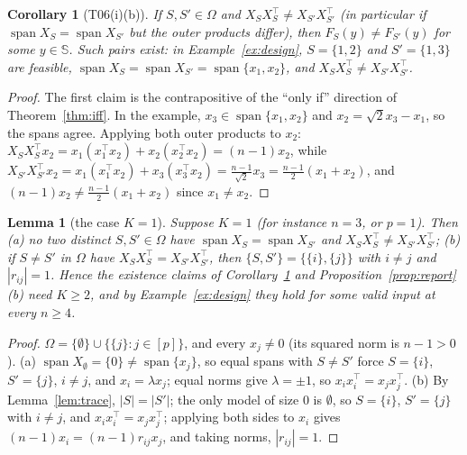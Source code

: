 \documentclass[11pt]{article}
\newtheorem{lemma}[theorem]{Lemma}
\newtheorem{corollary}[theorem]{Corollary}
\theoremstyle{remark}
\newcommand{\Sph}{\mathbb S}
\DeclareMathOperator{\spn}{span}
\begin{document}
\begin{corollary}[T06(i)(b)]\label{cor:span}
If $S,S'\in\Omega$ and $X_SX_S^\top\ne X_{S'}X_{S'}^\top$ (in particular if $\spn X_S=\spn X_{S'}$ but the outer products differ), then $F_S(y)\ne F_{S'}(y)$ for some $y\in\Sph$. Such pairs exist: in Example~\ref{ex:design}, $S=\{1,2\}$ and $S'=\{1,3\}$ are feasible, $\spn X_S=\spn X_{S'}=\spn\{x_1,x_2\}$, and $X_SX_S^\top\ne X_{S'}X_{S'}^\top$.
\end{corollary}
\begin{proof}
The first claim is the contrapositive of the ``only if'' direction of Theorem~\ref{thm:iff}. In the example, $x_3\in\spn\{x_1,x_2\}$ and $x_2=\sqrt2x_3-x_1$, so the spans agree. Applying both outer products to $x_2$: $X_SX_S^\top x_2=x_1(x_1^\top x_2)+x_2(x_2^\top x_2)=(n-1)x_2$, while $X_{S'}X_{S'}^\top x_2=x_1(x_1^\top x_2)+x_3(x_3^\top x_2)=\tfrac{n-1}{\sqrt2}x_3=\tfrac{n-1}2(x_1+x_2)$, and $(n-1)x_2\ne\frac{n-1}2(x_1+x_2)$ since $x_1\ne x_2$.
\end{proof}

\begin{lemma}[the case $K=1$]\label{lem:K1}
Suppose $K=1$ (for instance $n=3$, or $p=1$). Then (a) no two distinct $S,S'\in\Omega$ have $\spn X_S=\spn X_{S'}$ and $X_SX_S^\top\ne X_{S'}X_{S'}^\top$; (b) if $S\ne S'$ in $\Omega$ have $X_SX_S^\top=X_{S'}X_{S'}^\top$, then $\{S,S'\}=\{\{i\},\{j\}\}$ with $i\ne j$ and $|r_{ij}|=1$. Hence the existence claims of Corollary~\ref{cor:span} and Proposition~\ref{prop:report}(b) need $K\ge2$, and by Example~\ref{ex:design} they hold for some valid input at every $n\ge4$.
\end{lemma}
\begin{proof}
$\Omega=\{\emptyset\}\cup\{\{j\}:j\in[p]\}$, and every $x_j\ne0$ (its squared norm is $n-1>0$). (a) $\spn X_\emptyset=\{0\}\ne\spn\{x_j\}$, so equal spans with $S\ne S'$ force $S=\{i\}$, $S'=\{j\}$, $i\ne j$, and $x_i=\lambda x_j$; equal norms give $\lambda=\pm1$, so $x_ix_i^\top=x_jx_j^\top$. (b) By Lemma~\ref{lem:trace}, $|S|=|S'|$; the only model of size $0$ is $\emptyset$, so $S=\{i\}$, $S'=\{j\}$ with $i\ne j$, and $x_ix_i^\top=x_jx_j^\top$; applying both sides to $x_i$ gives $(n-1)x_i=(n-1)r_{ij}x_j$, and taking norms, $|r_{ij}|=1$.
\end{proof}
\end{document}
